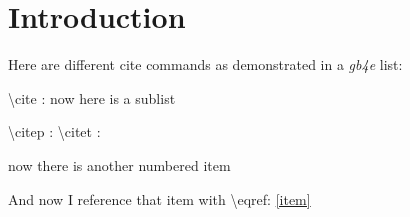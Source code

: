 \chapter[Introduction]%
{Introduction}\label{chap:Intro} %



Here are different cite commands as demonstrated in a \emph{gb4e} list:

\begin{exe}
    \ex \textbackslash cite : \cite{chomsky-why-2016}
    \ex now here is a sublist \begin{xlista}
    \ex \textbackslash citep : \citep{chomsky-why-2016}
    \ex \textbackslash citet{} : \citet{chomsky-why-2016}
    \end{xlista}
    \ex\label{item} now there is another numbered item
\end{exe}
And now I reference that item with \textbackslash eqref: \eqref{item}
